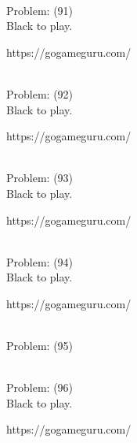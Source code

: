 \documentclass[11pt]{article}
\begin{document}
\begin{minipage}[t]{0.5\textwidth}
  {\centering
  
\\
  Problem: (91)\\
  Black to play.

https://gogameguru.com/\\
  }
\end{minipage}
\begin{minipage}[t]{0.5\textwidth}
  {\centering
  
\\
  Problem: (92)\\
  Black to play.

https://gogameguru.com/\\
  }
\end{minipage}
\begin{minipage}[t]{0.5\textwidth}
  {\centering
  
\\
  Problem: (93)\\
  Black to play.

https://gogameguru.com/\\
  }
\end{minipage}
\begin{minipage}[t]{0.5\textwidth}
  {\centering
  
\\
  Problem: (94)\\
  Black to play.

https://gogameguru.com/\\
  }
\end{minipage}
\begin{minipage}[t]{0.5\textwidth}
  {\centering
  
\\
  Problem: (95)\\
  
  }
\end{minipage}
\begin{minipage}[t]{0.5\textwidth}
  {\centering
  
\\
  Problem: (96)\\
  Black to play.

https://gogameguru.com/\\
  }
\end{minipage}
\end{document}
